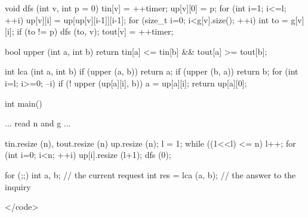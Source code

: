 void dfs (int v, int p = 0) {
tin[v] = ++timer;
up[v][0] = p;
for (int i=1; i<=l; ++i)
up[v][i] = up[up[v][i-1]][i-1];
for (size_t i=0; i<g[v].size(); ++i) {
int to = g[v][i];
if (to != p)
dfs (to, v);
}
tout[v] = ++timer;
}

bool upper (int a, int b) {
return tin[a] <= tin[b] && tout[a] >= tout[b];
}

int lca (int a, int b) {
if (upper (a, b)) return a;
if (upper (b, a)) return b;
for (int i=l; i>=0; --i)
if (! upper (up[a][i], b))
a = up[a][i];
return up[a][0];
}

int main() {

... read n and g ...

tin.resize (n), tout.resize (n) up.resize (n);
l = 1;
while ((1<<l) <= n) l++;
for (int i=0; i<n; ++i) up[i].resize (l+1);
dfs (0);

for (;;) {
int a, b; // the current request
int res = lca (a, b); // the answer to the inquiry
}

}</code>